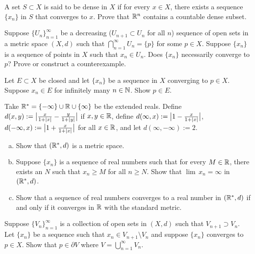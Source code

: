 \begin{exercise}
A set $S \subset X$ is said to be dense in $X$ if for every $x \in X$,
there exists a sequence $\{ x_n \}$ in $S$ that converges to $x$.  Prove
that ${\mathbb{R}}^n$ contains a countable dense subset.
\end{exercise}

\begin{exercise}[Tricky]
Suppose $\{ U_n \}_{n=1}^\infty$ be a decreasing ($U_{n+1} \subset U_n$ for
all $n$) sequence of open sets in a metric space $(X,d)$ such that
$\bigcap_{n=1}^\infty U_n = \{ p \}$ for some $p \in X$.  Suppose 
$\{ x_n \}$ is a sequence of points in $X$ such that $x_n \in U_n$.  Does
$\{ x_n \}$ necessarily converge to $p$?  Prove or construct a counterexample.
\end{exercise}

\begin{exercise}
Let $E \subset X$ be closed and
let $\{ x_n \}$ be a sequence in $X$ converging to $p \in X$.  Suppose
$x_n \in E$ for infinitely many $n \in {\mathbb{N}}$.  Show $p \in E$.
\end{exercise}

\begin{exercise} \label{exercise:extendedrealsmetric}
Take ${\mathbb{R}}^* = \{ -\infty \} \cup {\mathbb{R}} \cup \{ \infty \}$ be the extended reals.
Define $d(x,y) := \bigl\lvert \frac{x}{1+\left\lvert {x} \right\rvert} - \frac{y}{1+\left\lvert {y} \right\rvert}
\bigr\rvert$
if $x, y \in {\mathbb{R}}$,
define $d(\infty,x) := \bigl\lvert 1 - \frac{x}{1+\left\lvert {x} \right\rvert} \bigr\rvert$,
$d(-\infty,x) := \bigl\lvert 1 + \frac{x}{1+\left\lvert {x} \right\rvert} \bigr\rvert$
for all $x \in {\mathbb{R}}$, and
let $d(\infty,-\infty) := 2$.
\begin{enumerate}[a)]
\item
Show that $({\mathbb{R}}^*,d)$ is a metric space.
\item
Suppose $\{ x_n \}$ is a sequence of real numbers such that
for every $M \in {\mathbb{R}}$, there exists an $N$ such that
$x_n \geq M$ for all $n \geq N$.  Show that $\lim\, x_n = \infty$ in
$({\mathbb{R}}^*,d)$.
\item
Show that a sequence of real numbers converges to a real number
in $({\mathbb{R}}^*,d)$ if and
only if it converges in ${\mathbb{R}}$ with the standard metric.
\end{enumerate}
\end{exercise}

\begin{exercise}
Suppose $\{ V_n \}_{n=1}^\infty$ is a collection of open sets
in $(X,d)$
such that $V_{n+1} \supset V_n$.  Let $\{ x_n \}$ be a sequence
such that $x_n \in V_{n+1} \setminus V_n$ and suppose 
$\{ x_n \}$ converges to $p \in X$.  Show that $p \in \partial V$
where $V = \bigcup_{n=1}^\infty V_n$.
\end{exercise}

